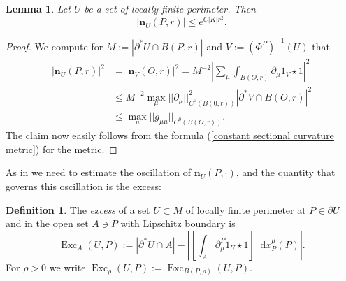 \documentclass[reqno,10pt]{amsart}
\DeclareMathOperator{\Exc}{Exc}
\newcommand*\dif{\mathop{}\!\mathrm{d}}
\newcommand{\normal}{\mathbf n}
\newcommand{\dfn}[1]{\emph{#1}\index{#1}}
\newtheorem{lemma}[theorem]{Lemma}
\theoremstyle{definition}
\newtheorem{definition}[theorem]{Definition}
\numberwithin{equation}{section}
\begin{document}
\begin{lemma}\label{gauge invariance of the normal}
Let $U$ be a set of locally finite perimeter. Then
$$|\normal_U(P, r)| \leq e^{C|K|r^2}.$$
\end{lemma}
\begin{proof}
We compute for $M := |\partial^* U \cap B(P, r)|$ and $V := (\Phi^P)^{-1}(U)$ that 
\begin{align*}
|\normal_U(P, r)|^2 &= |\normal_V(O, r)|^2 = M^{-2} \left|\sum_\mu \int_{B(O, r)} \partial_\mu 1_V \star 1\right|^2 \\
&\leq M^{-2} \max_\mu ||\partial_\mu||_{C^0(B(0, r))}^2 |\partial^* V \cap B(O, r)|^2 \\
&\leq \max_\mu ||g_{\mu\mu}||_{C^0(B(O, r))}.
\end{align*}
The claim now easily follows from the formula (\ref{constant sectional curvature metric}) for the metric.
\end{proof}

As in \cite[Chapters 8-9]{Giusti77} we need to estimate the oscillation of $\normal_U(P, \cdot)$, and the quantity that governs this oscillation is the excess:

\begin{definition}
The \dfn{excess} of a set $U \subset M$ of locally finite perimeter at $P \in \partial U$ and in the open set $A \ni P$ with Lipschitz boundary is 
$$\Exc_A(U, P) := |\partial^* U \cap A| - \left|\left[\int_A \partial^P_\mu 1_U \star 1\right] \dif x_P^\mu(P)\right|.$$
For $\rho > 0$ we write $\Exc_\rho(U, P) := \Exc_{B(P, \rho)}(U, P)$.
\end{definition}
\end{document}
